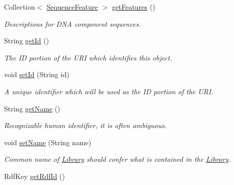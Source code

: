 \begin{DoxyCompactItemize}
Collection$<$ \hyperlink{classorg_1_1sbolstandard_1_1lib_s_b_o_lj_1_1_sequence_feature}{SequenceFeature} $>$ \hyperlink{classorg_1_1sbolstandard_1_1lib_s_b_o_lj_1_1_library_a6e4112a6cec45766efb5ce852f1e764e}{getFeatures} ()
\begin{DoxyCompactList}\small\item\em Descriptions for DNA component sequences. \item\end{DoxyCompactList}\item 
String \hyperlink{classorg_1_1sbolstandard_1_1lib_s_b_o_lj_1_1_library_aab219518f0eaf3db55b6a62ad6b49407}{getId} ()
\begin{DoxyCompactList}\small\item\em The ID portion of the URI which identifies this object. \item\end{DoxyCompactList}\item 
void \hyperlink{classorg_1_1sbolstandard_1_1lib_s_b_o_lj_1_1_library_a0baf110c74c46a69b4c7a93bb68001b4}{setId} (String id)
\begin{DoxyCompactList}\small\item\em A unique identifier which will be used as the ID portion of the URI. \item\end{DoxyCompactList}\item 
String \hyperlink{classorg_1_1sbolstandard_1_1lib_s_b_o_lj_1_1_library_a78ee178b6a73658d65ca60da4d1e6683}{getName} ()
\begin{DoxyCompactList}\small\item\em Recognizable human identifier, it is often ambiguous. \item\end{DoxyCompactList}\item 
void \hyperlink{classorg_1_1sbolstandard_1_1lib_s_b_o_lj_1_1_library_ad737b36b74be994e0d8420797ed72f78}{setName} (String name)
\begin{DoxyCompactList}\small\item\em Common name of \hyperlink{classorg_1_1sbolstandard_1_1lib_s_b_o_lj_1_1_library}{Library} should confer what is contained in the \hyperlink{classorg_1_1sbolstandard_1_1lib_s_b_o_lj_1_1_library}{Library}. \item\end{DoxyCompactList}\item 
RdfKey \hyperlink{classorg_1_1sbolstandard_1_1lib_s_b_o_lj_1_1_library_a98d34c30847c78a8922be878a2fa4d49}{getRdfId} ()

\end{DoxyCompactItemize}
